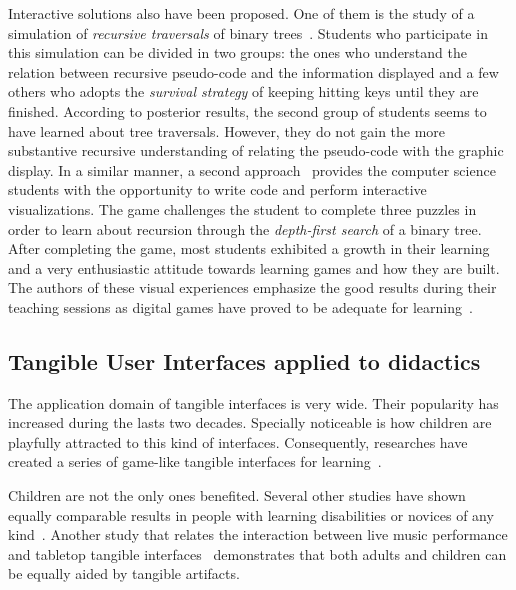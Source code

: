 Interactive solutions also have been proposed. One of them is the
study of a simulation of \emph{recursive traversals} of binary
trees~\cite{KurtzJohnson:1985}. Students who participate in this
simulation can be divided in two groups: the ones who understand the
relation between recursive pseudo\hyp{}code and the information
displayed and a few others who adopts the \emph{survival strategy}
of keeping hitting keys until they are finished. According to
posterior results, the second group of students seems to have learned
about tree traversals. However, they do not gain the more substantive
recursive understanding of relating the pseudo\hyp{}code with the
graphic display. In a similar manner, a second
approach~\cite{ChaffinDoranHicksBarnes:2009} provides the computer
science students with the opportunity to write code and perform
interactive visualizations. The game challenges the student to
complete three puzzles in order to learn about recursion through
the \emph{depth\hyp{}first search} of a binary tree. After completing
the game, most students exhibited a growth in their learning and a
very enthusiastic attitude towards learning games and how they are
built. The authors of these visual experiences emphasize the good
results during their teaching sessions as digital games have proved to
be adequate for learning~\cite{Nelson:1962, InbarStoll:1970,
  Prensky:2003}.


\subsection{Tangible User Interfaces applied to didactics}

The application domain of tangible interfaces is very wide. Their
popularity has increased during the lasts two decades. Specially
noticeable is how children are playfully attracted to this kind of
interfaces. Consequently, researches have created a series of
game\hyp{}like tangible interfaces for learning~\cite{EEMB:2009,
  Marshall:2007, PRSSN:2003, RSGSH:2002}.

Children are not the only ones benefited. Several other studies have
shown equally comparable results in people with learning disabilities
or novices of any kind~\cite{ZuckermanAridaResnick:2005}. Another
study that relates the interaction between live music performance and
tabletop tangible interfaces~\cite{JGAK:2007} demonstrates that both
adults and children can be equally aided by tangible artifacts.


